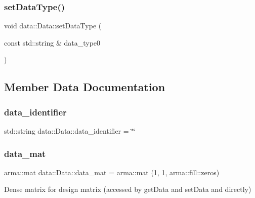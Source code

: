 \subsubsection{\texorpdfstring{set\+Data\+Type()}{setDataType()}}
{\footnotesize\ttfamily void data\+::\+Data\+::set\+Data\+Type (\begin{DoxyParamCaption}\item[{const std\+::string \&}]{data\+\_\+type0 }\end{DoxyParamCaption})}



\subsection{Member Data Documentation}
\mbox{\label{classdata_1_1_data_ad61ef163c5ec01dd46be054a688d2be8}} 
\subsubsection{\texorpdfstring{data\+\_\+identifier}{data\_identifier}}
{\footnotesize\ttfamily std\+::string data\+::\+Data\+::data\+\_\+identifier = \char`\"{}\char`\"{}\hspace{0.3cm}{\ttfamily [protected]}}

\mbox{\label{classdata_1_1_data_ae78ec61bd569e32f3b34056d3f6f48f4}} 
\subsubsection{\texorpdfstring{data\+\_\+mat}{data\_mat}}
{\footnotesize\ttfamily arma\+::mat data\+::\+Data\+::data\+\_\+mat = arma\+::mat (1, 1, arma\+::fill\+::zeros)}



Dense matrix for design matrix (accessed by get\+Data and set\+Data and directly) 

\mbox{\label{classdata_1_1_data_a3aa3b54f91bede8726e22ccfe8751b31}} 
